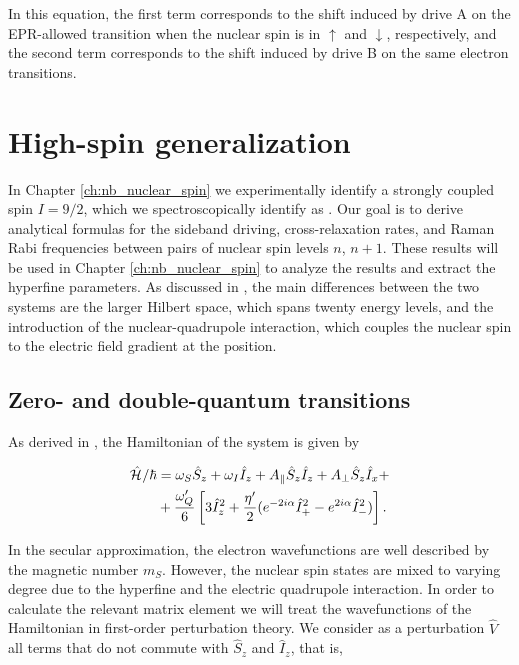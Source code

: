 In this equation, the first term corresponds to the shift induced by drive A on the EPR-allowed transition when the nuclear spin is in $\uparrow$ and $\downarrow$, respectively, and the second term corresponds to the shift induced by drive B on the same electron transitions.

\section{High-spin generalization}

In Chapter \ref{ch:nb_nuclear_spin} we experimentally identify a strongly coupled spin $I=9/2$, which we spectroscopically identify as \Nb. Our goal is to derive analytical formulas for the sideband driving, cross-relaxation rates, and Raman Rabi frequencies between pairs of nuclear spin levels $n$, $n+1$. These results will be used in Chapter \ref{ch:nb_nuclear_spin} to analyze the results and extract the hyperfine parameters. As discussed in , the main differences between the two systems are the larger Hilbert space, which spans twenty energy levels, and the introduction of the nuclear-quadrupole interaction, which couples the nuclear spin to the electric field gradient at the \Nb position. 

\subsection{Zero- and double-quantum transitions}

As derived in , the Hamiltonian of the system is given by

\begin{align}
\begin{split}
       \hat{\mathcal{H}}_{\text{}}/\hbar &= \omega_S \hat{S}_z + \omega_I \hat{I}_z + A_\parallel \hat{S}_z \hat{I}_z + A_\perp \hat{S}_z \hat{I}_x + \\ 
        &+ \frac{\omega_Q'}{6} \left[3\hat{I}_{z}^2 + \frac{\eta'}{2}(e^{-2i\alpha}\hat{I}_+^2-e^{2i\alpha}\hat{I}_{-}^2)\right].
\end{split}
\end{align}

In the secular approximation, the electron wavefunctions are well described by the magnetic number $m_S$. However, the nuclear spin states are mixed to varying degree due to the hyperfine and the electric quadrupole interaction. In order to calculate the relevant matrix element we will treat the wavefunctions of the Hamiltonian in first-order perturbation theory. We consider as a perturbation $\hat{V}$ all terms that do not commute with $\hat{S}_z$ and $\hat{I}_z$, that is, 

